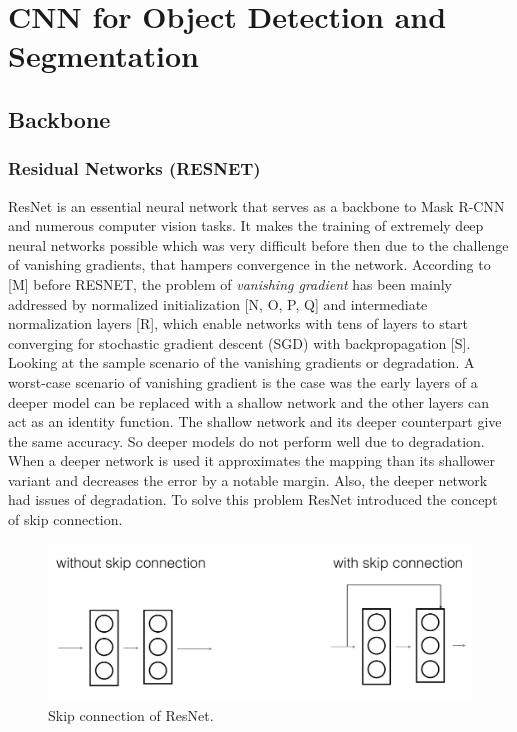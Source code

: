 \section{CNN for Object Detection and  Segmentation }

\subsection{Backbone}
\subsubsection{Residual Networks (RESNET)}
ResNet is an essential neural network that serves as a backbone to Mask R-CNN and numerous computer vision tasks. It makes the training of extremely deep neural networks possible which was very difficult before then due to the challenge of vanishing gradients, that hampers convergence in the network. According to [M] before RESNET, the problem of \textit{vanishing gradient} has been mainly addressed by normalized initialization [N, O, P, Q] and intermediate normalization layers [R], which enable networks with tens of layers to start converging for stochastic gradient descent (SGD) with backpropagation [S].
Looking at the sample scenario of the vanishing gradients or degradation. A worst-case scenario of vanishing gradient is the case was the early layers of a deeper model can be replaced with a shallow network and the other layers can act as an identity function.  The shallow network and its deeper counterpart give the same accuracy. So deeper models do not perform well due to degradation. When a deeper network is used it approximates the mapping than its shallower variant and decreases the error by a notable margin. Also, the deeper network had issues of degradation.
To solve this problem ResNet introduced the concept of skip connection.

\begin{figure}
 \centering
 \includegraphics[width=0.5\linewidth]{images/skipconnection.jpg}
 \caption{Skip connection of ResNet.}
\end{figure}

